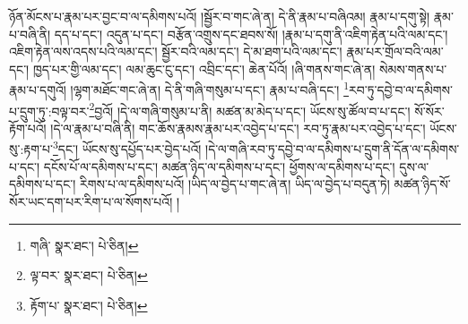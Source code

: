 ཉོན་མོངས་པ་རྣམ་པར་བྱང་བ་ལ་དམིགས་པའོ། །སྦྱོར་བ་གང་ཞེ་ན། དེ་ནི་རྣམ་པ་བཞིའམ། རྣམ་པ་དགུ་སྟེ། རྣམ་པ་བཞི་ནི། དད་པ་དང་། འདུན་པ་དང་། བརྩོན་འགྲུས་དང་ཐབས་སོ། །རྣམ་པ་དགུ་ནི་འཇིག་རྟེན་པའི་ལམ་དང་། འཇིག་རྟེན་ལས་འདས་པའི་ལམ་དང་། སྦྱོར་བའི་ལམ་དང་། དེ་མ་ཐག་པའི་ལམ་དང་། རྣམ་པར་གྲོལ་བའི་ལམ་དང་། ཁྱད་པར་གྱི་ལམ་དང་། ལམ་ཆུང་ངུ་དང་། འབྲིང་དང་། ཆེན་པོའོ། །ཞི་གནས་གང་ཞེ་ན། སེམས་གནས་པ་རྣམ་པ་དགུའོ། །ལྷག་མཐོང་གང་ཞེ་ན། དེ་ནི་གཞི་གསུམ་པ་དང་། རྣམ་པ་བཞི་དང་། \footnote{གཞི་  སྣར་ཐང་།  པེ་ཅིན། }རབ་ཏུ་དབྱེ་བ་ལ་དམིགས་པ་དྲུག་ཏུ་:བལྟ་བར་\footnote{ལྟ་བར་  སྣར་ཐང་།  པེ་ཅིན། }བྱའོ། །དེ་ལ་གཞི་གསུམ་པ་ནི། མཚན་མ་མེད་པ་དང་། ཡོངས་སུ་ཚོལ་བ་པ་དང་། སོ་སོར་རྟོག་པའོ། །དེ་ལ་རྣམ་པ་བཞི་ནི། གང་ཆོས་རྣམས་རྣམ་པར་འབྱེད་པ་དང་། རབ་ཏུ་རྣམ་པར་འབྱེད་པ་དང་། ཡོངས་སུ་:རྟག་པ་\footnote{རྟོག་པ་  སྣར་ཐང་།  པེ་ཅིན། }དང་། ཡོངས་སུ་དཔྱོད་པར་བྱེད་པའོ། །དེ་ལ་གཞི་རབ་ཏུ་དབྱེ་བ་ལ་དམིགས་པ་དྲུག་ནི་དོན་ལ་དམིགས་པ་དང་། དངོས་པོ་ལ་དམིགས་པ་དང་། མཚན་ཉིད་ལ་དམིགས་པ་དང་། ཕྱོགས་ལ་དམིགས་པ་དང་། དུས་ལ་དམིགས་པ་དང་། རིགས་པ་ལ་དམིགས་པའོ། །ཡིད་ལ་བྱེད་པ་གང་ཞེ་ན། ཡིད་ལ་བྱེད་པ་བདུན་ཏེ། མཚན་ཉིད་སོ་སོར་ཡང་དག་པར་རིག་པ་ལ་སོགས་པའོ། །
